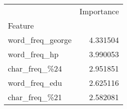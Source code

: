 \begin{tabular}{lr}
\toprule
{} &  Importance \\
Feature          &             \\
\midrule
word\_freq\_george &    4.331504 \\
word\_freq\_hp     &    3.990053 \\
char\_freq\_\%24    &    2.951851 \\
word\_freq\_edu    &    2.625116 \\
char\_freq\_\%21    &    2.582081 \\
\bottomrule
\end{tabular}
